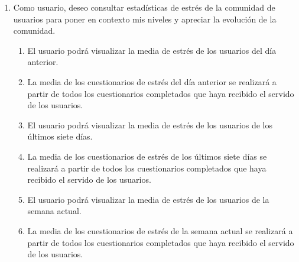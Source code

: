        \begin{enumerate}[resume=req-usuario,label=\textbf{\texttt{RU-\arabic*}}]
            \item \label{req:usuario:comunidad_estres} Como usuario, deseo consultar estadísticas de estrés de la comunidad de usuarios para poner en contexto mis niveles y apreciar la evolución de la comunidad.
            \begin{enumerate}[resume=req-funcionales,label=\textbf{\texttt{RF-\arabic*}}]
                \item \label{req:funcionales:comunidad_estres_dia_anterior_ver} El usuario podrá visualizar la media de estrés de los usuarios del día anterior.
                \item \label{req:funcionales:comunidad_estres_dia_anterior_criterio} La media de los cuestionarios de estrés del día anterior se realizará a partir de todos los cuestionarios completados que haya recibido el servido de los usuarios.
                \item \label{req:funcionales:comunidad_estres_siete_dias_ver} El usuario podrá visualizar la media de estrés de los usuarios de los últimos siete días.
                \item \label{req:funcionales:comunidad_estres_siete_dias_criterio} La media de los cuestionarios de estrés de los últimos siete días se realizará a partir de todos los cuestionarios completados que haya recibido el servido de los usuarios.
                \item \label{req:funcionales:comunidad_estres_semana_actual_ver} El usuario podrá visualizar la media de estrés de los usuarios de la semana actual.
                \item \label{req:funcionales:comunidad_estres_semana_actual_criterio} La media de los cuestionarios de estrés de la semana actual se realizará a partir de todos los cuestionarios completados que haya recibido el servido de los usuarios.
            \end{enumerate}
        \end{enumerate}
